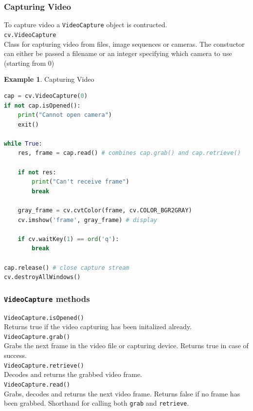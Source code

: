 \documentclass{article}
\theoremstyle{definition}
\newtheorem{ex}{Example}[subsection]
\theoremstyle{remark}
\newcommand{\func}[2]{\noindent\lstinline{#1}\\#2}
\begin{document}
\subsubsection{Capturing Video}

To capture video a \lstinline{VideoCapture} object is contructed.\\

\func{cv.VideoCapture}{
Class for capturing video from files, image sequences or cameras. The constuctor can either be passed a filename or an integer specifying which camera to use (starting from 0)
}

\begin{ex} Capturing Video
\begin{lstlisting}[language=Python]
cap = cv.VideoCapture(0)
if not cap.isOpened():
    print("Cannot open camera")
    exit()

while True:
    res, frame = cap.read() # combines cap.grab() and cap.retrieve()

    if not res:
        print("Can't receive frame")
        break

    gray_frame = cv.cvtColor(frame, cv.COLOR_BGR2GRAY)
    cv.imshow('frame', gray_frame) # display

    if cv.waitKey(1) == ord('q'):
        break

cap.release() # close capture stream
cv.destroyAllWindows()
\end{lstlisting}
\end{ex}


\subsubsection{\lstinline{VideoCapture} methods}

\hfill

\func{VideoCapture.isOpened()}{
Returns true if the video capturing has been initalized already.\\
}

\func{VideoCapture.grab()}{
Grabs the next frame in the video file or capturing device. Returns true in case of success.\\
}

\func{VideoCapture.retrieve()}{
Decodes and returns the grabbed video frame.\\
}

\func{VideoCapture.read()}{
Grabs, decodes and returns the next video frame. Returns false if no frame has been grabbed. Shorthand for calling both \lstinline{grab} and \lstinline{retrieve}.\\
}
\end{document}

